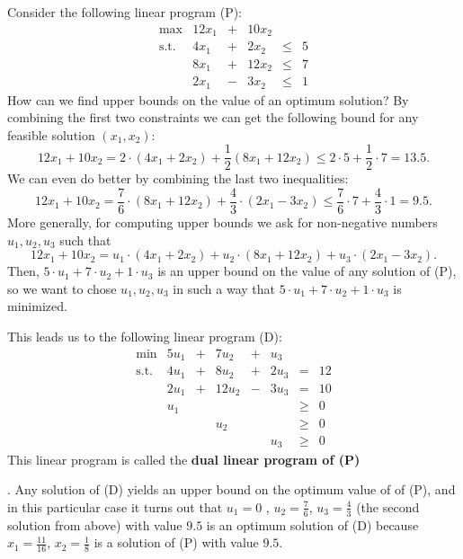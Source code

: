 \documentclass[12pt, showidx, twoside]{article}
\def\hi{\bf}
\begin{document}
{{{Consider the following linear program (P):
\[
\begin{array}{rrrrrr}
\max              & 12x_1 & + & 10x_2 &      &\\
\mbox{s.t.}       & 4x_1  & + &  2x_2 & \leq & 5\\
                  & 8x_1  & + & 12x_2 & \leq & 7\\
                  & 2x_1  & - &  3x_2 & \leq & 1
\end{array}
\]
How can we find upper bounds on the value of an optimum solution?
By combining the first two constraints we can get the following bound for
any feasible solution $(x_1,x_2)$:
\[
12x_1 + 10x_2 = 2 \cdot (4x_1+2x_2) + \frac{1}{2}(8x_1+12x_2) \leq 2 \cdot 5 + \frac{1}{2} \cdot 7 = 13.5.
\]
We can even do better by combining the last two inequalities:
\[
12x_1 + 10x_2 = \frac{7}{6} \cdot (8x_1 + 12x_2) + \frac{4}{3} \cdot (2x_1 - 3x_2) \leq \frac{7}{6} \cdot 7 + \frac{4}{3} \cdot 1 = 9.5.
\]
More generally, for computing upper bounds we ask for non-negative numbers $u_1,u_2,u_3$ such that
\[
12x_1 + 10x_2 = u_1 \cdot (4x_1 + 2x_2) + u_2 \cdot (8x_1 + 12x_2) + u_3  \cdot (2x_1 - 3x_2).
\]
Then, $5 \cdot u_1 + 7 \cdot u_2 + 1 \cdot u_3$ is an upper bound on the
value of any solution of (P), so we want to chose $u_1,u_2,u_3$ in such a way that
$5 \cdot u_1 + 7 \cdot u_2 + 1 \cdot u_3$ is minimized.

This leads us to the following linear program (D):
\[
\begin{array}{rrrrrrrr}
\min         & 5 u_1 & + &  7 u_2 & + &   u_3 &\\
\mbox{s.t.}  & 4 u_1 & + &  8 u_2 & + & 2 u_3 & = & 12\\
             & 2 u_1 & + & 12 u_2 & - & 3 u_3 & = & 10\\
             &   u_1 &   &        &    &       & \geq & 0\\
             &       &   &    u_2 &    &       & \geq & 0\\
             &       &   &        &    &  u_3  & \geq & 0
\end{array}
\]
This linear program is called the {\hi dual linear program of (P)}{.
Any solution of (D) yields an upper bound on the optimum value of 
of (P), and in this particular case
it turns out that $u_1 = 0$ , $u_2 = \frac{7}{6}$, $u_3 = \frac{4}{3}$ 
(the second solution from above) with value $9.5$ is an optimum solution of
(D) because
$x_1 = \frac{11}{16}$, $x_2 = \frac{1}{8}$ is a solution of (P) with value $9.5$.

}}}}
\end{document}
